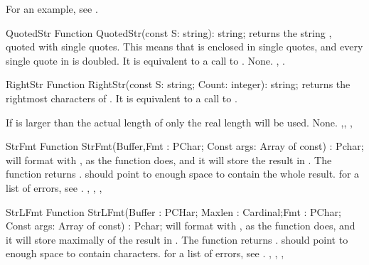 For an example, see .

\begin{function}{QuotedStr}
\Declaration
Function QuotedStr(const S: string): string;
\Description
{} returns the string , quoted with single quotes. This means
that  is enclosed in single quotes, and every single quote in 
is doubled. It is equivalent to a call to .
\Errors
None.
\SeeAlso
{}, .
\end{function}




\begin{function}{RightStr}
\Declaration
Function RightStr(const S: string; Count: integer): string;
\Description
{} returns the  rightmost characters of .
It is equivalent to a call to .

If  is larger than the actual length of  only the real
length will be used.
\Errors
None.
\SeeAlso
{},, , 
\end{function}



\begin{function}{StrFmt}
\Declaration
Function StrFmt(Buffer,Fmt : PChar; Const args: Array of const) : Pchar;
\Description
{} will format  with , as the 
function does, and it will store the result in . The function
returns .  should point to enough space to contain
the whole result.
\Errors
for a list of errors, see .
\SeeAlso
{}, , , 
\end{function}



\begin{function}{StrLFmt}
\Declaration
Function StrLFmt(Buffer : PCHar; Maxlen : Cardinal;Fmt : PChar; Const args: Array of const) : Pchar;
\Description
{} will format  with , as the 
function does, and it will store maximally  of the
result in . The function returns . 
should point to enough space to contain  characters.
\Errors
for a list of errors, see .
\SeeAlso
{}, , , 
\end{function}

